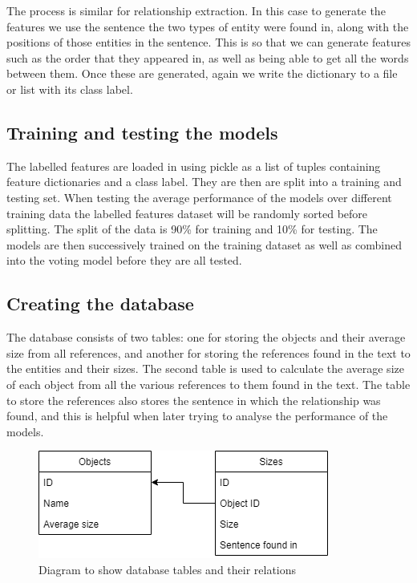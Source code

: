 \documentclass[11pt,oneside]{book}
\begin{document}
The process is similar for relationship extraction. In this case to generate the features we use the sentence the two types of entity were found in, along with the positions of those entities in the sentence. This is so that we can generate features such as the order that they appeared in, as well as being able to get all the words between them. Once these are generated, again we write the dictionary to a file or list with its class label.

\subsection{Training and testing the models}
The labelled features are loaded in using pickle as a list of tuples containing feature dictionaries and a class label. They are then are split into a training and testing set. When testing the average performance of the models over different training data the labelled features dataset will be randomly sorted before splitting. The split of the data is 90\% for training and 10\% for testing. The models are then successively trained on the training dataset as well as combined into the voting model before they are all tested.

\subsection{Creating the database}
The database consists of two tables: one for storing the objects and their average size from all references, and another for storing the references found in the text to the entities and their sizes. The second table is used to calculate the average size of each object from all the various references to them found in the text. The table to store the references also stores the sentence in which the relationship was found, and this is helpful when later trying to analyse the performance of the models.

\begin{figure}[!htbp]
\centering
\includegraphics[scale=0.7]{figures/DatabaseDiagram.png}
\caption{Diagram to show database tables and their relations}
\label{fig:model_flow}
\end{figure}
\end{document}
